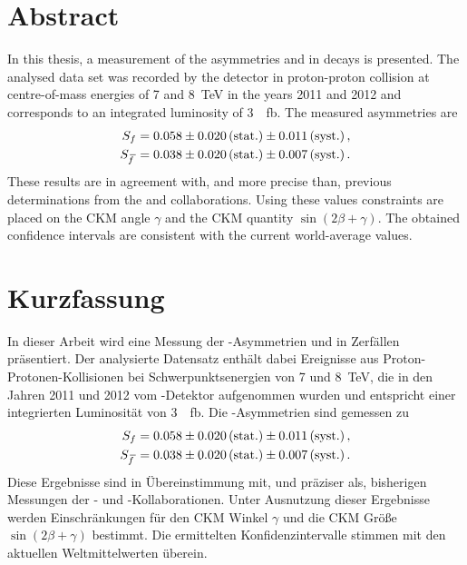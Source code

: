 \section*{Abstract}

\linespread{1.08}\selectfont
In this thesis, a measurement of the \CP asymmetries \Sf and \Sfbar in \BdToDpi decays is presented.
The analysed data set was recorded by the \lhcb detector in proton-proton collision  at centre-of-mass energies of \num{7} and \SI{8}{\tera\electronvolt} in the years \num{2011} and \num{2012} and corresponds to an integrated luminosity of \SI{3}{\per\femto\barn}.
The measured \mbox{\CP asymmetries} are
\begin{align}
\mbox{\ensuremath{S_{f}}}&=0.058\pm0.020\mathrm{\,(stat.)}\pm0.011\mathrm{\,(syst.)}\,,\nonumber\\
\mbox{\ensuremath{S_{\kern 1.5pt\overline{\kern -1.5pt f\kern 1.5pt}}}}&=0.038\pm0.020\mathrm{\,(stat.)}\pm0.007\mathrm{\,(syst.)}\,.\nonumber
\end{align}
These results are in agreement with, and more precise than, previous determinations from the \belle and \babar collaborations.
Using these values constraints are placed on the CKM angle $\gamma$ and the CKM quantity $\sin\!\left(2\beta+\gamma\right)$.
The obtained confidence intervals are consistent with the current world-average values.

\section*{Kurzfassung}

\linespread{1.08}\selectfont
In dieser Arbeit wird eine Messung der \CP-Asymmetrien \Sf und \Sfbar in \mbox{\BdToDpi} Zerfällen präsentiert.
Der analysierte Datensatz enthält dabei Ereignisse aus Proton-Protonen-Kollisionen bei Schwerpunktsenergien von \num{7} und \SI{8}{\tera\electronvolt}, die in den Jahren \num{2011} und \num{2012} vom \lhcb-Detektor aufgenommen wurden und entspricht einer integrierten Luminosität von \SI{3}{\per\femto\barn}.
Die \mbox{\CP-Asymmetrien} sind gemessen zu
\begin{align}
\mbox{\ensuremath{S_{f}}}&=0.058\pm0.020\mathrm{\,(stat.)}\pm0.011\mathrm{\,(syst.)}\,,\nonumber\\
\mbox{\ensuremath{S_{\kern 1.5pt\overline{\kern -1.5pt f\kern 1.5pt}}}}&=0.038\pm0.020\mathrm{\,(stat.)}\pm0.007\mathrm{\,(syst.)}\,.\nonumber
\end{align}
Diese Ergebnisse sind in Übereinstimmung mit, und präziser als, bisherigen Messungen der \belle- und \babar-Kollaborationen.
Unter Ausnutzung dieser Ergebnisse werden Einschränkungen für den CKM Winkel $\gamma$ und die CKM Größe $\sin\!\left(2\beta+\gamma\right)$ bestimmt.
Die ermittelten Konfidenzintervalle stimmen mit den aktuellen Weltmittelwerten überein.
